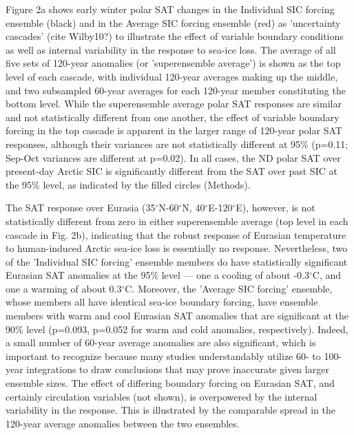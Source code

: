 \documentclass[grl]{AGUTeX}  %
\begin{document}
\begin{article}
Figure 2a shows early winter polar SAT changes in the Individual SIC forcing ensemble (black) and in the Average SIC forcing ensemble (red) as 'uncertainty cascades' (cite Wilby10?) to illustrate the effect of variable boundary conditions as well as internal variability in the response to sea-ice loss. The average of all five sets of 120-year anomalies (or 'superensemble average') is shown as the top level of each cascade, with individual 120-year averages making up the middle, and two subsampled 60-year averages for each 120-year member constituting the bottom level. While the superensemble average polar SAT responses are similar and not statistically different from one another, the effect of variable boundary forcing in the top cascade is apparent in the larger range of 120-year polar SAT responses, although their variances are not statistically different at 95\% (p=0.11; Sep-Oct variances are different at p=0.02). In all cases, the ND polar SAT over present-day Arctic SIC is significantly different from the SAT over past SIC at the 95\% level, as indicated by the filled circles (Methods). 

The SAT response over Eurasia (35$^\circ$N-60$^\circ$N, 40$^\circ$E-120$^\circ$E), however, is not statistically different from zero in either superensemble average (top level in each cascade in Fig. 2b), indicating that the robust response of Eurasian temperature to human-induced Arctic sea-ice loss is essentially no response. Nevertheless, two of the 'Individual SIC forcing' ensemble members do have statistically significant Eurasian SAT anomalies at the 95\% level --- one a cooling of about -0.3$^\circ$C, and one a warming of about 0.3$^\circ$C. Moreover, the 'Average SIC forcing' ensemble, whose members all have identical sea-ice boundary forcing, have ensemble members with warm and cool Eurasian SAT anomalies that are significant at the 90\% level (p=0.093, p=0.052 for warm and cold anomalies, respectively). Indeed, a small number of 60-year average anomalies are also significant, which is important to recognize because many studies understandably utilize 60- to 100-year integrations to draw conclusions that may prove inaccurate given larger ensemble sizes. The effect of differing boundary forcing on Eurasian SAT, and certainly circulation variables (not shown), is overpowered by the internal variability in the response. This is illustrated by the comparable spread in the 120-year average anomalies between the two ensembles. 


\end{article}
\end{document}
